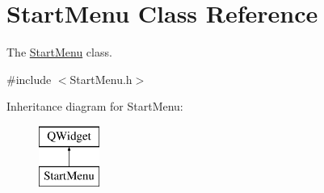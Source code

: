 \hypertarget{classStartMenu}{\section{Start\-Menu Class Reference}
\label{classStartMenu}
}


The \hyperlink{classStartMenu}{Start\-Menu} class.  




{\ttfamily \#include $<$Start\-Menu.\-h$>$}

Inheritance diagram for Start\-Menu\-:\begin{figure}[H]
\begin{center}
\leavevmode
\includegraphics[height=2.000000cm]{classStartMenu}
\end{center}
\end{figure}
